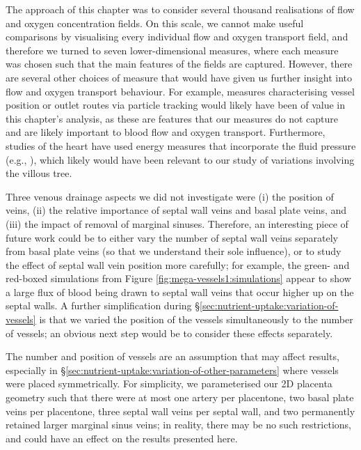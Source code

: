         The approach of this chapter was to consider several thousand realisations of flow and oxygen concentration fields. On this scale, we cannot make useful comparisons by visualising every individual flow and oxygen transport field, and therefore we turned to seven lower-dimensional measures, where each measure was chosen such that the main features of the fields are captured. However, there are several other choices of measure that would have given us further insight into flow and oxygen transport behaviour. For example, measures characterising vessel position or outlet routes via particle tracking would likely have been of value in this chapter's analysis, as these are features that our measures do not capture and are likely important to blood flow and oxygen transport. Furthermore, studies of the heart have used energy measures that incorporate the fluid pressure (e.g., \cite{rijnbergEnergeticsBloodFlow2018,whiteheadNonlinearPowerLoss2007}), which likely would have been relevant to our study of variations involving the villous tree.

        Three venous drainage aspects we did not investigate were (i) the position of veins, (ii) the relative importance of septal wall veins and basal plate veins, and (iii) the impact of removal of marginal sinuses. Therefore, an interesting piece of future work could be to either vary the number of septal wall veins separately from basal plate veins (so that we understand their sole influence), or to study the effect of septal wall vein position more carefully; for example, the green- and red-boxed simulations from Figure \ref{fig:mega-vessels1:simulations} appear to show a large flux of blood being drawn to septal wall veins that occur higher up on the septal walls. A further simplification during \S\ref{sec:nutrient-uptake:variation-of-vessels} is that we varied the position of the vessels simultaneously to the number of vessels; an obvious next step would be to consider these effects separately.

        The number and position of vessels are an assumption that may affect results, especially in \S\ref{sec:nutrient-uptake:variation-of-other-parameters} where vessels were placed symmetrically. For simplicity, we parameterised our 2D placenta geometry such that there were at most one artery per placentone, two basal plate veins per placentone, three septal wall veins per septal wall, and two permanently retained larger marginal sinus veins; in reality, there may be no such restrictions, and could have an effect on the results presented here.

